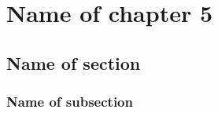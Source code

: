 

\graphicspath{{5/figures/}} %


\chapter{\label{ch5}Name of chapter 5} %

\section{\label{}Name of section}

\subsection{\label{}Name of subsection}




